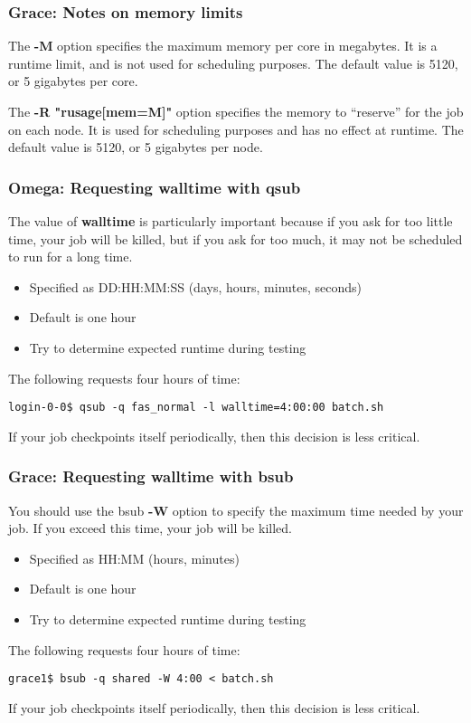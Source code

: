 \documentclass[10pt]{beamer}
\begin{document}
\begin{frame}
\frametitle{Grace: Notes on memory limits}
The \textbf{-M} option specifies the maximum memory per core in
megabytes.
It is a runtime limit, and is not used for scheduling purposes.
The default value is 5120, or 5 gigabytes per core.

\vskip10pt
The \textbf{-R "rusage[mem=M]"} option specifies the memory to ``reserve''
for the job on each node. It is used for scheduling purposes and has no
effect at runtime.
The default value is 5120, or 5 gigabytes per node.
\end{frame}

\begin{frame}[fragile]
\frametitle{Omega: Requesting walltime with qsub}
The value of \textbf{walltime} is particularly important because if you
ask for too little time, your job will be killed, but if you ask for too
much, it may not be scheduled to run for a long time.

\begin{itemize}
\item Specified as DD:HH:MM:SS (days, hours, minutes, seconds)
\item Default is one hour
\item Try to determine expected runtime during testing
\end{itemize}

The following requests four hours of time:

\begin{verbatim}
login-0-0$ qsub -q fas_normal -l walltime=4:00:00 batch.sh
\end{verbatim}

If your job checkpoints itself periodically, then this decision is
less critical.
\end{frame}

\begin{frame}[fragile]
\frametitle{Grace: Requesting walltime with bsub}
You should use the bsub \textbf{-W} option to specify the maximum time
needed by your job. If you exceed this time, your job will be killed.

\begin{itemize}
\item Specified as HH:MM (hours, minutes)
\item Default is one hour
\item Try to determine expected runtime during testing
\end{itemize}

The following requests four hours of time:

\begin{verbatim}
grace1$ bsub -q shared -W 4:00 < batch.sh
\end{verbatim}

If your job checkpoints itself periodically, then this decision is
less critical.
\end{frame}
\end{document}
